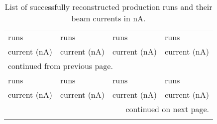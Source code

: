 \small
\begin{center}
\begin{singlespacing}
\begin{longtable}{lr|lr|lr|lr}
\caption[Production Run List]{\label{tab:data.cook.prodruns}List of successfully reconstructed production runs and their beam currents in nA.} \\

\hline \hline
\multicolumn{2}{l|}{runs} & \multicolumn{2}{l|}{runs} & \multicolumn{2}{l|}{runs} & \multicolumn{2}{l}{runs} \\
\multicolumn{2}{r|}{current (nA)} & \multicolumn{2}{r|}{current (nA)}  & \multicolumn{2}{r|}{current (nA)} & \multicolumn{2}{r}{current (nA)} \\
\hline
\endfirsthead

\multicolumn{8}{l}{\scriptsize continued from previous page.} \\
\hline
\multicolumn{2}{l|}{runs} & \multicolumn{2}{l|}{runs} & \multicolumn{2}{l|}{runs} & \multicolumn{2}{l}{runs} \\
\multicolumn{2}{r|}{current (nA)} & \multicolumn{2}{r|}{current (nA)}  & \multicolumn{2}{r|}{current (nA)} & \multicolumn{2}{r}{current (nA)} \\
\hline
\endhead

\hline
\multicolumn{8}{r}{\scriptsize continued on next page.} \\
\endfoot

\hline \hline
\endlastfoot


\end{longtable}
\end{singlespacing}
\end{center}
